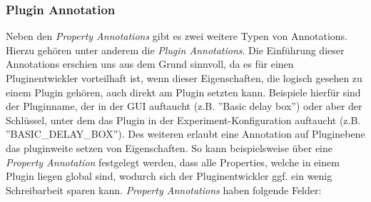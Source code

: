 \documentclass[a4paper, 11pt]{article} %
\begin{document}
\subsubsection{Plugin Annotation} %
\label{ssub:plugin_annotation}
Neben den \emph{Property Annotations} gibt es zwei weitere Typen von Annotations. Hierzu gehören unter anderem die \emph{Plugin Annotations}. Die Einführung dieser Annotations erschien uns aus dem Grund sinnvoll, da es für einen Pluginentwickler vorteilhaft ist, wenn dieser Eigenschaften, die logisch gesehen zu einem Plugin gehören, auch direkt am Plugin setzten kann. Beispiele hierfür sind der Pluginname, der in der GUI auftaucht (z.B. ''Basic delay box'') oder aber der Schlüssel, unter dem das Plugin in der Experiment-Konfiguration auftaucht (z.B. ''BASIC\_DELAY\_BOX''). Des weiteren erlaubt eine Annotation auf Pluginebene das pluginweite setzen von Eigenschaften. So kann beispielsweise über eine \emph{Property Annotation} festgelegt werden, dass alle Properties, welche in einem Plugin liegen global sind, wodurch sich der Pluginentwickler ggf. ein wenig Schreibarbeit sparen kann. \emph{Property Annotations} haben folgende Felder:
\end{document}
